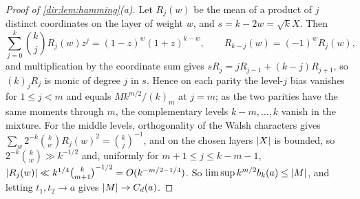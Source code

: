 \begin{proof}[Proof of \cref{dir:lem:hamming}\textup{(a)}]
Let $R_j(w)$ be the mean of a product of $j$ distinct coordinates on the layer of weight $w$, and
$s=k-2w=\sqrt kX$. Then
\begin{equation}\label{dir:eq:layer}
 \sum_{j=0}^k\binom kjR_j(w)z^j=(1-z)^w(1+z)^{k-w},\qquad R_{k-j}(w)=(-1)^wR_j(w),
\end{equation}
and multiplication by the coordinate sum gives $sR_j=jR_{j-1}+(k-j)R_{j+1}$, so $(k)_jR_j$ is
monic of degree $j$ in $s$. Hence on each parity the level-$j$ bias vanishes for $1\le j<m$ and
equals $Mk^{m/2}/(k)_m$ at $j=m$; as the two parities have the same moments through $m$, the
complementary levels $k-m,\dots,k$ vanish in the mixture. For the middle levels, orthogonality of
the Walsh characters gives $\sum_w2^{-k}\binom kwR_j(w)^2=\binom kj^{-1}$, and on the chosen
layers $\lvert X\rvert$ is bounded, so $2^{-k}\binom kw\gg k^{-1/2}$ and, uniformly for
$m+1\le j\le k-m-1$, $\lvert R_j(w)\rvert\ll k^{1/4}\binom k{m+1}^{-1/2}=O(k^{-m/2-1/4})$. So
$\limsup k^{m/2}b_k(a)\le\lvert M\rvert$, and letting $t_1,t_2\to a$ gives $\lvert M\rvert\to C_d(a)$.
\end{proof}

